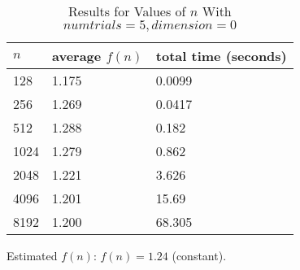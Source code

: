 \documentclass[11pt]{article}
\begin{document}
	\begin{table}[h]
		\centering
		\caption{Results for Values of $n$ With $numtrials = 5, dimension = 0$}
		\begin{tabular}{lll}
			$n$                         & average $f(n)$                        & total time (seconds)                        \\ \hline
			\multicolumn{1}{|l|}{128} & \multicolumn{1}{l|}{1.175} & \multicolumn{1}{l|}{0.0099} \\ \hline
			\multicolumn{1}{|l|}{256}    & \multicolumn{1}{l|}{1.269}       & \multicolumn{1}{l|}{0.0417}       \\ \hline
			\multicolumn{1}{|l|}{512}    & \multicolumn{1}{l|}{1.288}       & \multicolumn{1}{l|}{0.182}       \\ \hline
			\multicolumn{1}{|l|}{1024}    & \multicolumn{1}{l|}{1.279}       & \multicolumn{1}{l|}{0.862}       \\ \hline
			\multicolumn{1}{|l|}{2048}    & \multicolumn{1}{l|}{1.221}       & \multicolumn{1}{l|}{3.626}       \\ \hline
			\multicolumn{1}{|l|}{4096}    & \multicolumn{1}{l|}{1.201}       & \multicolumn{1}{l|}{15.69}       \\ \hline
			\multicolumn{1}{|l|}{8192}    & \multicolumn{1}{l|}{1.200}       & \multicolumn{1}{l|}{68.305}       \\ \hline
		\end{tabular}
	\end{table}
	Estimated $f(n)$: $f(n) = 1.24$ (constant).
	
\end{document}
